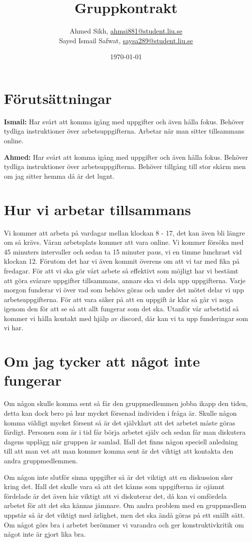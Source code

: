 \documentclass{mall}
\author{Ahmed Sikh, \url{ahmsi881@student.liu.se}\\
  Sayed Ismail Safwat, \url{saysa289@student.liu.se}\\
  }
\title{Gruppkontrakt}
\date{\today}
\begin{document}
\projectpage


\section{Förutsättningar}
\label{prereq}
\textbf{Ismail:}
Har svårt att komma igång med uppgifter och även hålla fokus. Behöver tydliga instruktioner över arbetsuppgifterna. Arbetar när man sitter tillsammans online.

\textbf{Ahmed:}
Har svårt att komma igång med uppgifter och även hålla fokus. Behöver tydliga
instruktioner över arbetsuppgifterna. Behöver tillgång till stor skärm men om
jag sitter hemma då är det lugnt.

\section{Hur vi arbetar tillsammans}

Vi kommer att arbeta på vardagar mellan klockan 8 - 17, det kan även bli längre om så krävs. Våran arbetsplats kommer att vara online. Vi kommer försöka med 45 minuters intervaller och sedan ta 15 minuter paus, vi en timme lunchrast vid klockan 12. Förutom det har vi även kommit överens om att vi tar med fika på fredagar. För att vi ska gör vårt arbete så effektivt som möjligt har vi bestämt att göra svårare uppgifter tillsammans, annars ska vi dela upp uppgifterna. Varje morgon funderar vi över vad som behövs göras och under det mötet delar vi upp arbetsuppgifterna. För att vara säker på att en uppgift är klar så går vi noga igenom den för att se så att allt fungerar som det ska. Utanför vår arbetstid så kommer vi hålla kontakt med hjälp av discord, där kan vi ta upp funderingar som vi har.




\section{Om jag tycker att något inte fungerar}
Om någon skulle komma sent så får den gruppmedlemmen jobba ikapp den tiden, detta kan dock bero på hur mycket försenad individen i fråga är. Skulle någon komma väldigt mycket försent så är det självklart att det arbetet måste göras färdigt. Personen som är i tid får börja arbetet själv och sedan får man diskutera dagens upplägg när gruppen är samlad.  Ifall det finns någon speciell anledning till att man vet att man kommer komma sent är det viktigt att kontakta den andra gruppmedlemmen.

Om någon inte slutför sinna uppgifter så är det viktigt att en diskussion sker kring det. Ifall det skulle vara så att det känns som uppgifterna är ojämnt fördelade är det även här viktigt att vi diskuterar det, då kan vi omfördela arbetet för att det ska kännas jämnare. Om andra problem med en gruppmedlem uppstår så är det viktigt med ärlighet, men det ska ändå göras på ett snällt sätt. Om något görs bra i arbetet berömmer vi varandra och ger konstruktivkritik om något inte är gjort lika bra.
\end{document}
